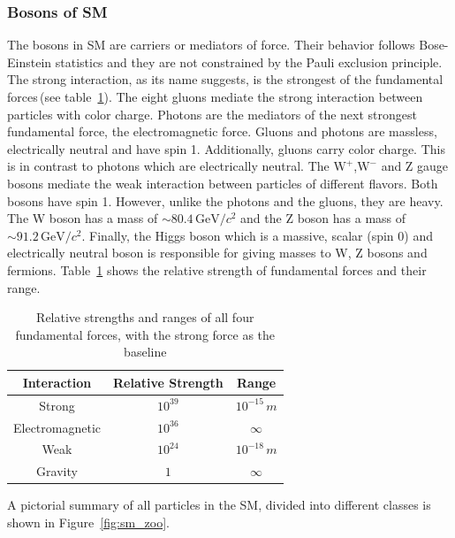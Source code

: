 \subsubsection{Bosons of SM}
The bosons in SM are carriers or mediators of force. Their behavior follows Bose-Einstein statistics and they are not constrained by the Pauli exclusion principle. The strong interaction, as its name suggests, is the strongest of the fundamental forces\,(see table~\ref{tab:forces}). The eight gluons mediate the strong interaction between particles with color charge. Photons are the mediators of the next strongest fundamental force, the electromagnetic force. Gluons and photons are massless, electrically neutral and have spin 1. Additionally, gluons carry color charge. This is in contrast to photons which are electrically neutral. The $\mathrm{W}^+$,$\mathrm{W}^-$ and Z gauge bosons mediate the weak interaction between particles of different flavors. Both bosons have spin 1. However, unlike the photons and the gluons, they are heavy. The W boson has a mass of $\sim 80.4\,\mathrm{GeV}/c^2$ and the Z boson has a mass of $\sim 91.2\,\mathrm{GeV}/c^2$. Finally, the Higgs boson which is a massive, scalar (spin 0) and electrically neutral boson is responsible for giving masses to W, Z bosons and fermions. Table~\ref{tab:forces} shows the relative strength of fundamental forces and their range.         

\begin{table}[hbtp]
\begin{center}
\caption{Relative strengths and ranges of all four fundamental forces, with the strong force as the baseline}
\begin{tabular}{c|c|c}
\hline
Interaction & Relative Strength & Range \\
\hline
Strong & $10^{39}$ & $10^{-15}\,m$\\
Electromagnetic & $10^{36}$& $\infty$\\
Weak &  $10^{24}$ &$10^{-18}\,m$\\
Gravity & $1$ &$\infty$\\
\hline
\end{tabular}
\label{tab:forces}
\end{center}
\end{table}

A pictorial summary of all particles in the SM, divided into different classes is shown in Figure~\ref{fig:sm_zoo}.

